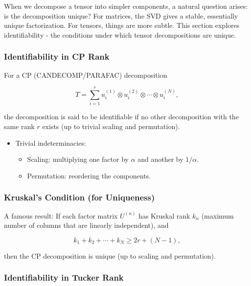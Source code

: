 \documentclass[
  letterpaper,
  DIV=11,
  numbers=noendperiod]{scrreprt}
\providecommand{\tightlist}{%
  \setlength{\itemsep}{0pt}\setlength{\parskip}{0pt}}
\begin{document}
When we decompose a tensor into simpler components, a natural question
arises: is the decomposition unique? For matrices, the SVD gives a
stable, essentially unique factorization. For tensors, things are more
subtle. This section explores identifiability - the conditions under
which tensor decompositions are unique.

\subsubsection{Identifiability in CP
Rank}\label{identifiability-in-cp-rank}

For a CP (CANDECOMP/PARAFAC) decomposition

\[
T = \sum_{i=1}^r u^{(1)}_i \otimes u^{(2)}_i \otimes \cdots \otimes u^{(N)}_i,
\]

the decomposition is said to be identifiable if no other decomposition
with the same rank \(r\) exists (up to trivial scaling and permutation).

\begin{itemize}
\item
  Trivial indeterminacies:

  \begin{itemize}
  \tightlist
  \item
    Scaling: multiplying one factor by \(\alpha\) and another by
    \(1/\alpha\).
  \item
    Permutation: reordering the components.
  \end{itemize}
\end{itemize}

\subsubsection{Kruskal's Condition (for
Uniqueness)}\label{kruskals-condition-for-uniqueness}

A famous result: If each factor matrix \(U^{(n)}\) has Kruskal rank
\(k_n\) (maximum number of columns that are linearly independent), and

\[
k_1 + k_2 + \cdots + k_N \geq 2r + (N-1),
\]

then the CP decomposition is unique (up to scaling and permutation).

\subsubsection{Identifiability in Tucker
Rank}\label{identifiability-in-tucker-rank}
\end{document}
